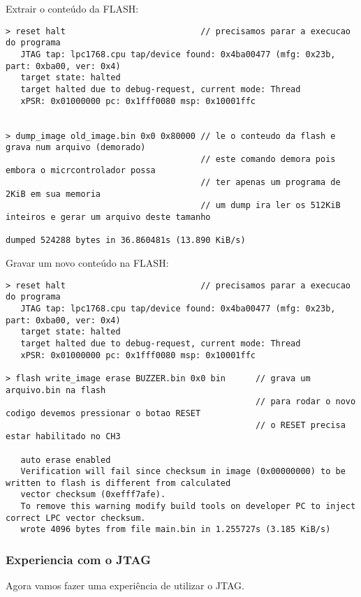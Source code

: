 \documentclass[a4paper,10pt]{article}
\begin{document}
Extrair o conteúdo da FLASH:
\begin{lstlisting}
> reset halt                           // precisamos parar a execucao do programa 
   JTAG tap: lpc1768.cpu tap/device found: 0x4ba00477 (mfg: 0x23b, part: 0xba00, ver: 0x4)
   target state: halted
   target halted due to debug-request, current mode: Thread 
   xPSR: 0x01000000 pc: 0x1fff0080 msp: 0x10001ffc
   
   
> dump_image old_image.bin 0x0 0x80000 // le o conteudo da flash e grava num arquivo (demorado)
                                       // este comando demora pois embora o micrcontrolador possa
                                       // ter apenas um programa de 2KiB em sua memoria
                                       // um dump ira ler os 512KiB inteiros e gerar um arquivo deste tamanho

dumped 524288 bytes in 36.860481s (13.890 KiB/s)
\end{lstlisting}




Gravar um novo conteúdo na FLASH:
\begin{lstlisting}
> reset halt                           // precisamos parar a execucao do programa 
   JTAG tap: lpc1768.cpu tap/device found: 0x4ba00477 (mfg: 0x23b, part: 0xba00, ver: 0x4)
   target state: halted
   target halted due to debug-request, current mode: Thread 
   xPSR: 0x01000000 pc: 0x1fff0080 msp: 0x10001ffc
   
> flash write_image erase BUZZER.bin 0x0 bin      // grava um arquivo.bin na flash
                                                  // para rodar o novo codigo devemos pressionar o botao RESET
                                                  // o RESET precisa estar habilitado no CH3

   auto erase enabled
   Verification will fail since checksum in image (0x00000000) to be written to flash is different from calculated 
   vector checksum (0xefff7afe).
   To remove this warning modify build tools on developer PC to inject correct LPC vector checksum.
   wrote 4096 bytes from file main.bin in 1.255727s (3.185 KiB/s)
\end{lstlisting}





\subsubsection{Experiencia com o JTAG}
Agora vamos fazer uma experiência de utilizar o JTAG.
\end{document}
